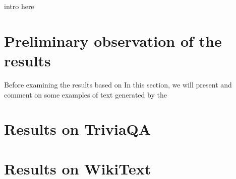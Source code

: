 intro here

\section{Preliminary observation of the results}
Before examining the results based on In this section, we will present and comment on some examples of text generated by the 
\section{Results on TriviaQA}
\section{Results on WikiText}